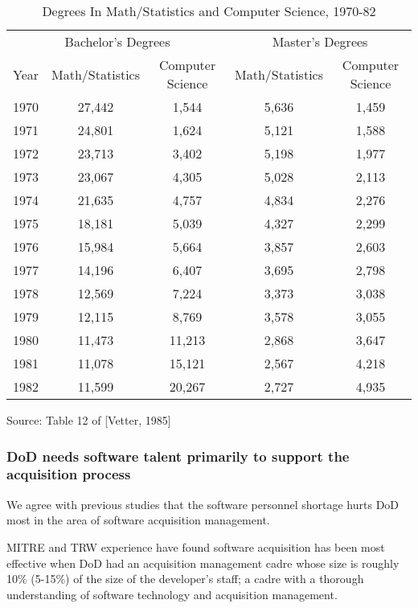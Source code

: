 \documentclass[12pt,final]{article}
\begin{document}
\begin{table}[ht]
    \caption{Degrees In Math/Statistics and Computer Science, 1970-82}
    \label{table:cs-degrees}
\begin{center}
    \begin{tabular}{ c c c c c }
        \multicolumn{3}{c}{Bachelor’s Degrees} & \multicolumn{2}{c}{Master’s Degrees}\\
        Year & Math/Statistics & Computer Science & Math/Statistics & Computer Science\\
        1970 & 27,442 & 1,544 & 5,636 & 1,459\\
        1971 & 24,801 & 1,624 & 5,121 & 1,588\\
        1972 & 23,713 & 3,402 & 5,198 & 1,977\\
        1973 & 23,067 & 4,305 & 5,028 & 2,113\\
        1974 & 21,635 & 4,757 & 4,834 & 2,276\\
        1975 & 18,181 & 5,039 & 4,327 & 2,299\\
        1976 & 15,984 & 5,664 & 3,857 & 2,603\\
        1977 & 14,196 & 6,407 & 3,695 & 2,798\\
        1978 & 12,569 & 7,224 & 3,373 & 3,038\\
        1979 & 12,115 & 8,769 & 3,578 & 3,055\\
        1980 & 11,473 & 11,213 & 2,868 & 3,647\\
        1981 & 11,078 & 15,121 & 2,567 & 4,218\\
        1982 & 11,599 & 20,267 & 2,727 & 4,935\\
    \end{tabular}

    Source: Table 12 of [Vetter, 1985]
\end{center}
\end{table}


\subsubsection*{DoD needs software talent primarily to support the acquisition
process}

We agree with previous studies that the software personnel shortage hurts DoD
most in the area of software acquisition management.

MITRE and TRW experience have found software acquisition has been most
effective when DoD had an acquisition management cadre whose size is roughly
10\% (5-15\%) of the size of the developer’s staff; a cadre with a thorough
understanding of software technology and acquisition management.
\end{document}
